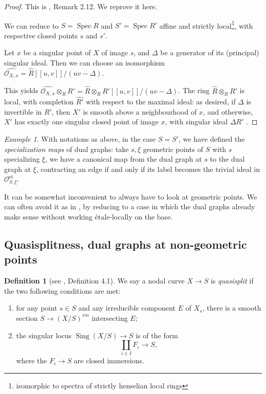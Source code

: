 \documentclass[a4paper,10pt,twoside]{article}
\newcommand{\ra}{\rightarrow}
\newcommand{\on}[1]{\operatorname{#1}}
\renewcommand{\O}{\mathcal{O}}
\DeclareMathOperator{\spec}{Spec}
\DeclareMathOperator{\sing}{Sing}
\theoremstyle{definition}
\newtheorem{defi}[thm]{Definition}
\theoremstyle{remark}
\newtheorem{ex}[thm]{Example}
\renewcommand{\on}[1]{\operatorname{#1}}
\begin{document}
\begin{proof}
	This is \cite{Holmes}, Remark 2.12. We reprove it here.
	
	We can reduce to $S=\spec R$ and $S'=\spec R'$ affine and strictly local\footnote{isomorphic to spectra of strictly henselian local rings}, with respective closed points $s$ and $s'$.
	
	Let $x$ be a singular point of $X$ of image $s$, and $\Delta$ be a generator of its (principal) singular ideal. Then we can choose an isomorphism $\widehat{\O_{X,x}}=\widehat{R}[[u,v]]/(uv-\Delta)$.

	This yields $\widehat{\O_{X,x}}\otimes_R R'=\widehat{R}\otimes_R R'[[u,v]]/(uv-\Delta)$. The ring $\widehat{R}\otimes_R R'$ is local, with completion $\widehat{R'}$ with respect to the maximal ideal: as desired, if $\Delta$ is invertible in $R'$, then $X'$ is smooth above a neighbourhood of $x$, and otherwise, $X'$ has exactly one singular closed point of image $x$, with singular ideal $\Delta R'$ .
\end{proof}

\begin{ex}\label{exemple specialization maps}
With notations as above, in the case $S=S'$, we have defined the \emph{specialization maps} of dual graphs: take $s,\xi$ geometric points of $S$ with $s$ specializing $\xi$, we have a canonical map from the dual graph at $s$ to the dual graph at $\xi$, contracting an edge if and only if its label becomes the trivial ideal in $\O_{S,\xi}^{\on{et}}$.
\end{ex}

It can be somewhat inconvenient to always have to look at geometric points. We can often avoid it as in \cite{HolmesUniversalJacobian}, by reducing to a case in which the dual graphs already make sense without working \'etale-locally on the base.

\subsection{Quasisplitness, dual graphs at non-geometric points}

\begin{defi}[see \cite{HolmesUniversalJacobian}, Definition 4.1]
	We say a nodal curve $X \to S$ is \emph{quasisplit} if the two following conditions are met:
\begin{enumerate}
\item for any point $s\in S$ and any irreducible component $E$ of $X_s$, there is a smooth section $S \to (X/S)^{sm}$ intersecting $E$;
\item the singular locus $\sing(X/S)\ra S$ is of the form
	\[
	\coprod\limits_{i\in I}F_i\ra S,
	\]
where the $F_i\to S$ are closed immersions.
\end{enumerate}	
\end{defi}
\end{document}
